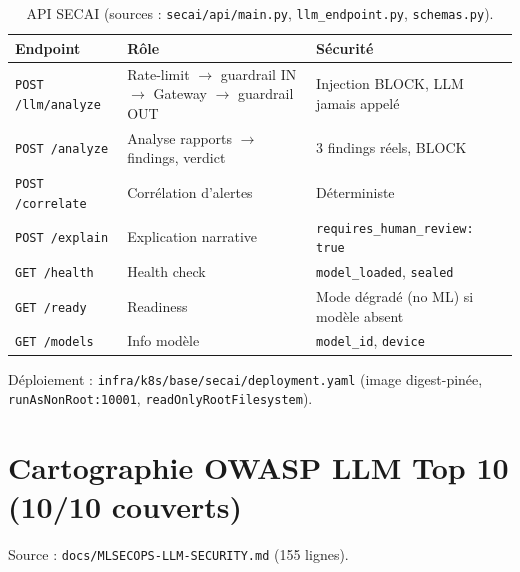 \documentclass[12pt,a4paper,openany]{report}
\begin{document}
\begin{table}[h]
\centering
\small
\begin{tabular}{@{}lll@{}}
\toprule
\textbf{Endpoint} & \textbf{Rôle} & \textbf{Sécurité} \\
\midrule
\texttt{POST /llm/analyze} & Rate-limit $\rightarrow$ guardrail IN $\rightarrow$ Gateway $\rightarrow$ guardrail OUT & Injection BLOCK, LLM jamais appelé \\
\texttt{POST /analyze} & Analyse rapports $\rightarrow$ findings, verdict & 3 findings réels, BLOCK \\
\texttt{POST /correlate} & Corrélation d'alertes & Déterministe \\
\texttt{POST /explain} & Explication narrative & \texttt{requires\_human\_review: true} \\
\texttt{GET /health} & Health check & \texttt{model\_loaded}, \texttt{sealed} \\
\texttt{GET /ready} & Readiness & Mode dégradé (no ML) si modèle absent \\
\texttt{GET /models} & Info modèle & \texttt{model\_id}, \texttt{device} \\
\bottomrule
\end{tabular}
\caption{API SECAI (sources : \texttt{secai/api/main.py}, \texttt{llm\_endpoint.py}, \texttt{schemas.py}).}
\label{tab:api-secai}
\end{table}

Déploiement : \texttt{infra/k8s/base/secai/deployment.yaml}
(image digest-pinée, \texttt{runAsNonRoot:10001}, \texttt{readOnlyRootFilesystem}).

\section{Cartographie OWASP LLM Top 10 (10/10 couverts)}

Source : \texttt{docs/MLSECOPS-LLM-SECURITY.md} (155 lignes).
\end{document}
